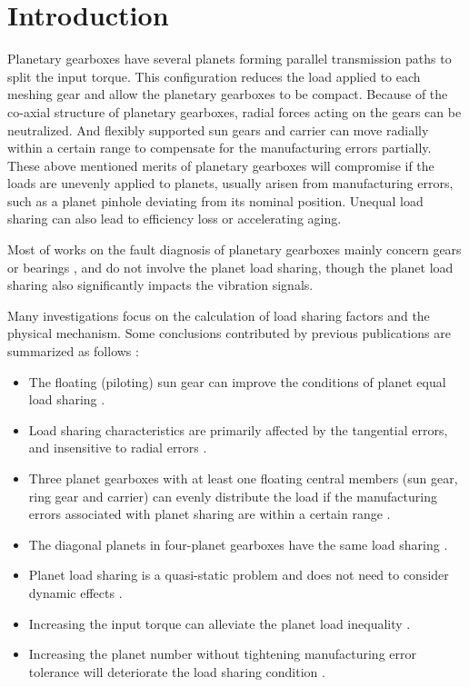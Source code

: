 \documentclass[a4paper,fleqn]{cas-sc}%
\begin{document}
\section{Introduction}
\par Planetary gearboxes have several planets forming parallel transmission paths to split the input torque. This configuration reduces the load applied to each meshing gear and allow the planetary gearboxes to be compact. Because of the co-axial structure of planetary gearboxes, radial forces acting on the gears can be neutralized. And flexibly supported sun gears and carrier can move radially within a certain range to compensate for the manufacturing errors partially. These above mentioned merits of planetary gearboxes will compromise if the loads are unevenly applied to planets, usually arisen from manufacturing errors, such as a planet pinhole deviating from its nominal position. Unequal load sharing can also lead to efficiency loss or accelerating aging. 
\par  Most of works  on the fault diagnosis of planetary gearboxes mainly concern gears \cite{Feng2012} or bearings \cite{Zhao2019}, and do not involve the planet load sharing, though the planet load sharing also significantly impacts the vibration signals.
\par Many investigations focus on the calculation of load sharing factors and the physical mechanism. Some conclusions contributed by previous publications are summarized as follows \cite{Singh2010511-530}:
\begin{itemize}
    \item The floating (piloting) sun gear can improve the conditions of planet equal load sharing \cite{seager1970}.
    \item Load sharing characteristics are primarily affected by the tangential errors, and insensitive to radial errors \cite{Bodas2004}. 
    \item Three planet gearboxes with at least one floating central members (sun gear, ring gear and carrier) can evenly distribute the load if the manufacturing errors associated with planet sharing are within a certain range \cite{Singh2010511-530}.
    \item The diagonal planets in four-planet gearboxes have the same load sharing \cite{Ligata2008}.
    \item Planet load sharing is a quasi-static problem and does not need to consider dynamic effects \cite{Kahraman1994}.
    \item Increasing the input torque can alleviate the planet load inequality \cite{Ligata2008}.
    \item Increasing the planet number without tightening manufacturing error tolerance will deteriorate the load sharing condition \cite{Singh2005}.
\end{itemize}
\end{document}
